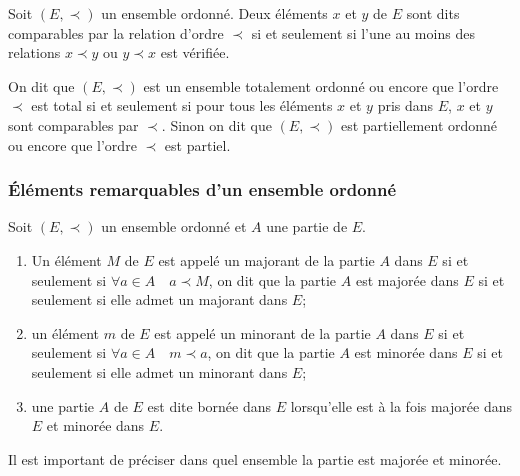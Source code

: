 \begin{defdef}
    Soit \((E, \prec)\) un ensemble ordonné. Deux éléments \(x\) et \(y\) de 
    \(E\) sont dits comparables par la relation d'ordre \(\prec\) si et 
    seulement si l'une au moins des relations \(x \prec y\) ou \(y \prec x\) est 
    vérifiée.
\end{defdef}

\begin{defdef}
    On dit que \((E, \prec)\) est un ensemble totalement ordonné ou encore que 
    l'ordre \(\prec\) est total si et seulement si pour tous les éléments \(x\) 
    et \(y\) pris dans \(E\), \(x\) et \(y\) sont comparables par \(\prec\). 
    Sinon on dit que \((E,\prec)\) est partiellement ordonné ou encore que 
    l'ordre \(\prec\) est partiel.
\end{defdef}

\subsubsection{Éléments remarquables d'un ensemble ordonné}
\label{chap3-subsubsec:elementremarquables}

Soit \((E,\prec)\) un ensemble ordonné et \(A\) une partie de \(E\).
\begin{defdef}
    \begin{enumerate}
        \item Un élément \(M\) de \(E\) est appelé un majorant de la partie 
            \(A\) dans \(E\) si et seulement si \(\forall a \in A \quad a \prec 
            M\), on dit que la partie \(A\) est majorée dans \(E\) si et 
            seulement si elle admet un majorant dans \(E\);
        \item un élément \(m\) de \(E\) est appelé un minorant de la partie 
            \(A\) dans \(E\) si et seulement si \(\forall a \in A \quad m \prec 
            a\), on dit que la partie \(A\) est minorée dans \(E\) si et 
            seulement si elle admet un minorant dans \(E\);
        \item une partie \(A\) de \(E\) est dite bornée dans \(E\) lorsqu'elle 
            est à la fois majorée dans \(E\) et minorée dans \(E\).
    \end{enumerate}
    Il est important de préciser dans quel ensemble la partie est majorée et 
    minorée.
\end{defdef}

